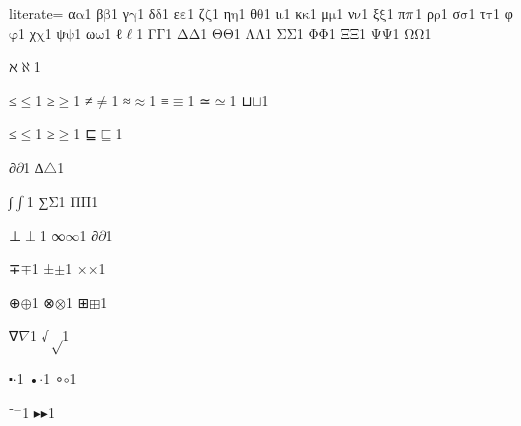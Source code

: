 {%
literate=
{α}{{\ensuremath{\mathrm{\alpha}}}}1
{β}{{\ensuremath{\mathrm{\beta}}}}1
{γ}{{\ensuremath{\mathrm{\gamma}}}}1
{δ}{{\ensuremath{\mathrm{\delta}}}}1
{ε}{{\ensuremath{\mathrm{\varepsilon}}}}1
{ζ}{{\ensuremath{\mathrm{\zeta}}}}1
{η}{{\ensuremath{\mathrm{\eta}}}}1
{θ}{{\ensuremath{\mathrm{\theta}}}}1
{ι}{{\ensuremath{\mathrm{\iota}}}}1
{κ}{{\ensuremath{\mathrm{\kappa}}}}1
{μ}{{\ensuremath{\mathrm{\mu}}}}1
{ν}{{\ensuremath{\mathrm{\nu}}}}1
{ξ}{{\ensuremath{\mathrm{\xi}}}}1
{π}{{\ensuremath{\mathrm{\mathnormal{\pi}}}}}1
{ρ}{{\ensuremath{\mathrm{\rho}}}}1
{σ}{{\ensuremath{\mathrm{\sigma}}}}1
{τ}{{\ensuremath{\mathrm{\tau}}}}1
{φ}{{\ensuremath{\mathrm{\varphi}}}}1
{χ}{{\ensuremath{\mathrm{\chi}}}}1
{ψ}{{\ensuremath{\mathrm{\psi}}}}1
{ω}{{\ensuremath{\mathrm{\omega}}}}1
{ℓ}{{\ensuremath{\mathrm{\ell}}}}1
{Γ}{{\ensuremath{\mathrm{\Gamma}}}}1
{Δ}{{\ensuremath{\mathrm{\Delta}}}}1
{Θ}{{\ensuremath{\mathrm{\Theta}}}}1
{Λ}{{\ensuremath{\mathrm{\Lambda}}}}1
{Σ}{{\ensuremath{\mathrm{\Sigma}}}}1
{Φ}{{\ensuremath{\mathrm{\Phi}}}}1
{Ξ}{{\ensuremath{\mathrm{\Xi}}}}1
{Ψ}{{\ensuremath{\mathrm{\Psi}}}}1
{Ω}{{\ensuremath{\mathrm{\Omega}}}}1

{ℵ}{{\ensuremath{\aleph}}}1

{≤}{{\ensuremath{\leq}}}1
{≥}{{\ensuremath{\geq}}}1
{≠}{{\ensuremath{\neq}}}1
{≈}{{\ensuremath{\approx}}}1
{≡}{{\ensuremath{\equiv}}}1
{≃}{{\ensuremath{\simeq}}}1
{⊔}{{\ensuremath{\sqcup}}}1

{≤}{{\ensuremath{\leq}}}1
{≥}{{\ensuremath{\geq}}}1
{⊑}{{\ensuremath{\sqsubseteq}}}1

{∂}{{\ensuremath{\partial}}}1
{∆}{{\ensuremath{\triangle}}}1 %

{∫}{{\ensuremath{\int}}}1
{∑}{{\ensuremath{\mathrm{\Sigma}}}}1
{Π}{{\ensuremath{\mathrm{\Pi}}}}1

{⊥}{{\ensuremath{\perp}}}1
{∞}{{\ensuremath{\infty}}}1
{∂}{{\ensuremath{\partial}}}1

{∓}{{\ensuremath{\mp}}}1
{±}{{\ensuremath{\pm}}}1
{×}{{\ensuremath{\times}}}1

{⊕}{{\ensuremath{\oplus}}}1
{⊗}{{\ensuremath{\otimes}}}1
{⊞}{{\ensuremath{\boxplus}}}1

{∇}{{\ensuremath{\nabla}}}1
{√}{{\ensuremath{\sqrt}}}1

{⬝}{{\ensuremath{\cdot}}}1
{•}{{\ensuremath{\cdot}}}1
{∘}{{\ensuremath{\circ}}}1

{⁻}{{\ensuremath{^{-}}}}1
{▸}{{\ensuremath{\blacktriangleright}}}1

}
